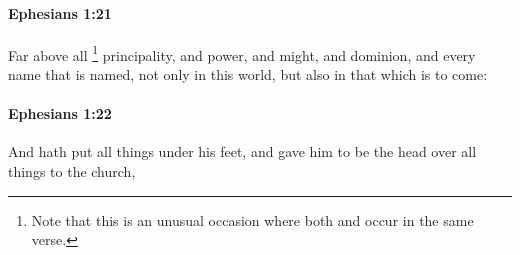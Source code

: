 		\paragraph{Ephesians 1:21} %
			\label{EPHESIANS-1-21}

			Far above all
				\footnote{%
					Note that this is an unusual occasion where both  and  occur in the same verse.
					}%
			principality, and power, and might, and dominion, and every name that is named, not only in this world, but also in that which is to come:

			\begin{framed}
			\scriptsize
				\begin{compactdesc}
					\item[SBLG] 
				\end{compactdesc}
			\end{framed}


		\paragraph{Ephesians 1:22} %
			\label{EPHESIANS-1-22}

			And hath put all things under his feet, and gave him to be the head over all things to the church,

